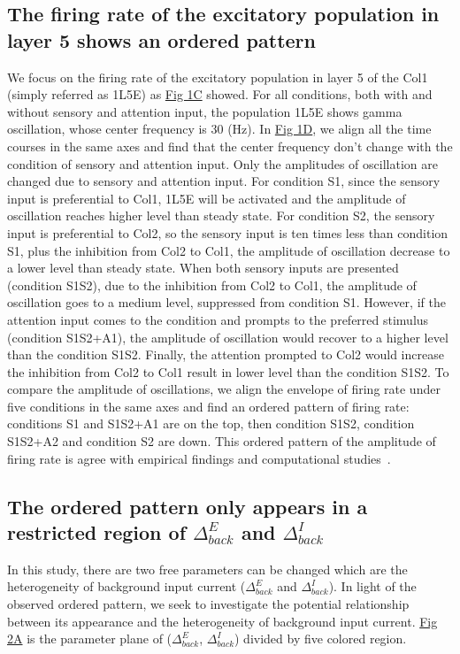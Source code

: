 \documentclass[10pt,letterpaper]{article}
\begin{document}
\subsection*{The firing rate of the excitatory population in layer 5 shows an ordered pattern}
We focus on the firing rate of the excitatory population in layer 5 of the Col1 (simply referred as 1L5E) as \hyperlink{fig:fig1}{Fig 1C} showed. For all conditions, both with and without sensory and attention input, the population 1L5E shows gamma oscillation, whose center frequency is 30 (Hz). In \hyperlink{fig:fig1}{Fig 1D}, we align all the time courses in the same axes and find that the center frequency don't change with the condition of sensory and attention input. Only the amplitudes of oscillation are changed due to sensory and attention input. For condition S1, since the sensory input is preferential to Col1, 1L5E will be activated and the amplitude of oscillation reaches higher level than steady state. For condition S2, the sensory input is preferential to Col2, so the sensory input is ten times less than condition S1, plus the inhibition from Col2 to Col1, the amplitude of oscillation decrease to a lower level than steady state. When both sensory inputs are presented (condition S1S2), due to the inhibition from Col2 to Col1, the amplitude of oscillation goes to a medium level, suppressed from condition S1. However, if the attention input comes to the condition and prompts to the preferred stimulus (condition S1S2+A1), the amplitude of oscillation would recover to a higher level than the condition S1S2. Finally, the attention prompted to Col2 would increase the inhibition from Col2 to Col1 result in lower level than the condition S1S2. To compare the amplitude of oscillations, we align the envelope of firing rate under five conditions in the same axes and find an ordered pattern of firing rate: conditions S1 and S1S2+A1 are on the top, then condition S1S2, condition S1S2+A2 and condition S2 are down. This ordered pattern of the amplitude of firing rate is agree with empirical findings and computational studies~\cite{bib1}.

\subsection*{The ordered pattern only appears in a restricted region of $\Delta_{back}^{E}$ and $\Delta_{back}^{I}$}
In this study, there are two free parameters can be changed which are the heterogeneity of background input current ($\Delta_{back}^{E}$ and $\Delta_{back}^{I}$). In light of the observed ordered pattern, we seek to investigate the potential relationship between its appearance and the heterogeneity of background input current. \hyperlink{fig:fig2}{Fig 2A} is the parameter plane of ($\Delta_{back}^{E}$, $\Delta_{back}^{I}$) divided by five colored region. 
\end{document}
